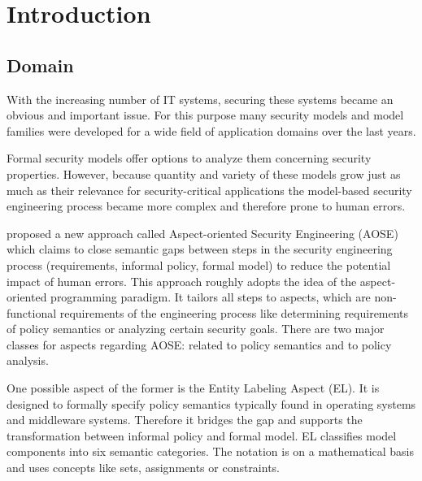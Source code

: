 \documentclass[twoside, openright, 12pt]{book}
\begin{document}
\cleardoublepage
\listoffigures
{}


%







\cleardoublepage
{}
\chapter{Introduction}
\label{introduction}

\section{Domain} 
\label{domain}
With the increasing number of IT systems, securing these systems became an obvious and important issue.
For this purpose many security models and model families were developed for a wide field of application domains over the last years.

Formal security models offer options to analyze them concerning security properties.
However, because quantity and variety of these models grow just as much as their relevance for security-critical applications the model-based security engineering process became more complex and therefore prone to human errors.

\citet*{Amthor18} proposed a new approach called Aspect-oriented Security Engineering (AOSE) which claims to close semantic gaps between steps in the security engineering process (requirements, informal policy, formal model) to reduce the potential impact of human errors.
This approach roughly adopts the idea of the aspect-oriented programming paradigm.
It tailors all steps to aspects, which are non-functional requirements of the engineering process like determining requirements of policy semantics or analyzing certain security goals.
There are two major classes for aspects regarding AOSE: related to policy semantics and to policy analysis.

One possible aspect of the former is the Entity Labeling Aspect (EL).
It is designed to formally specify policy semantics typically found in operating systems and middleware systems.
Therefore it bridges the gap and supports the transformation between informal policy and formal model.
EL classifies model components into six semantic categories.
The notation is on a mathematical basis and uses concepts like sets, assignments or constraints.
\end{document}

